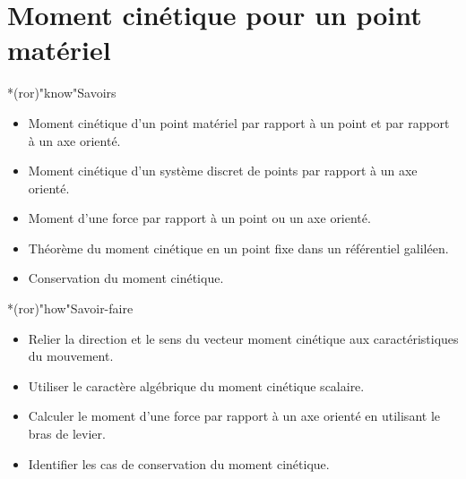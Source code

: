 \documentclass[../../main/main.tex]{subfiles}
\begin{document}
\setcounter{chapter}{5}


\chapter{Moment cin\'etique pour un point mat\'eriel}

\vspace*{\fill}

\begin{prgm}
	\small
	\begin{tcb}*(ror)"know"{Savoirs}
		\begin{itemize}
			\item Moment cinétique d'un point matériel par rapport à un point et par
			      rapport à un axe orienté.
			\item Moment cinétique d'un système discret de points par rapport à un axe
			      orienté.
			\item Moment d'une force par rapport à un point ou un axe orienté.
			\item Théorème du moment cinétique en un point fixe dans un référentiel
			      galiléen.
			\item Conservation du moment cinétique.
		\end{itemize}
	\end{tcb}
	\begin{tcb}*(ror)"how"{Savoir-faire}
		\begin{itemize}
			\item Relier la direction et le sens du vecteur moment cinétique aux
			      caractéristiques du mouvement.
			\item Utiliser le caractère algébrique du moment cinétique scalaire.
			\item Calculer le moment d'une force par rapport à un axe orienté en
			      utilisant le bras de levier.
			\item Identifier les cas de conservation du moment cinétique.
		\end{itemize}
	\end{tcb}
\end{prgm}



\vspace*{\fill}
\minitoc
\vspace*{\fill}

\newpage
\end{document}
